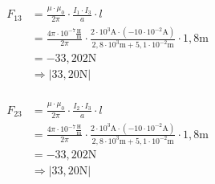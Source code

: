 \begin{enumerate}
        \begin{align*}
          F_{13} & =\frac{\mu\cdot\mu_{0}}{2\pi}\cdot\frac{I_{1}\cdot I_{3}}{a}\cdot l                                                                                                                         \\
                 & =\frac{4\pi\cdot 10^{-7}\frac{\text{H}}{\text{m}}}{2\pi}\cdot\frac{2\cdot 10^{3}\text{A}\cdot(-10\cdot 10^{-2}\text{A})}{2,8\cdot 10^{3}\text{m}+5,1\cdot 10^{-2}\text{m}}\cdot 1,8\text{m} \\
                 & =-33,202\text{N}                                                                                                                                                                            \\
                 & \Rightarrow |33,20\text{N}|                                                                                                                                                                 \\
        \end{align*}

        \begin{align*}
          F_{23} & =\frac{\mu\cdot\mu_{0}}{2\pi}\cdot\frac{I_{2}\cdot I_{3}}{a}\cdot l                                                                                                                         \\
                 & =\frac{4\pi\cdot 10^{-7}\frac{\text{H}}{\text{m}}}{2\pi}\cdot\frac{2\cdot 10^{3}\text{A}\cdot(-10\cdot 10^{-2}\text{A})}{2,8\cdot 10^{3}\text{m}+5,1\cdot 10^{-2}\text{m}}\cdot 1,8\text{m} \\
                 & =-33,202\text{N}                                                                                                                                                                            \\
                 & \Rightarrow |33,20\text{N}|                                                                                                                                                                 \\
        \end{align*}

\end{enumerate}
